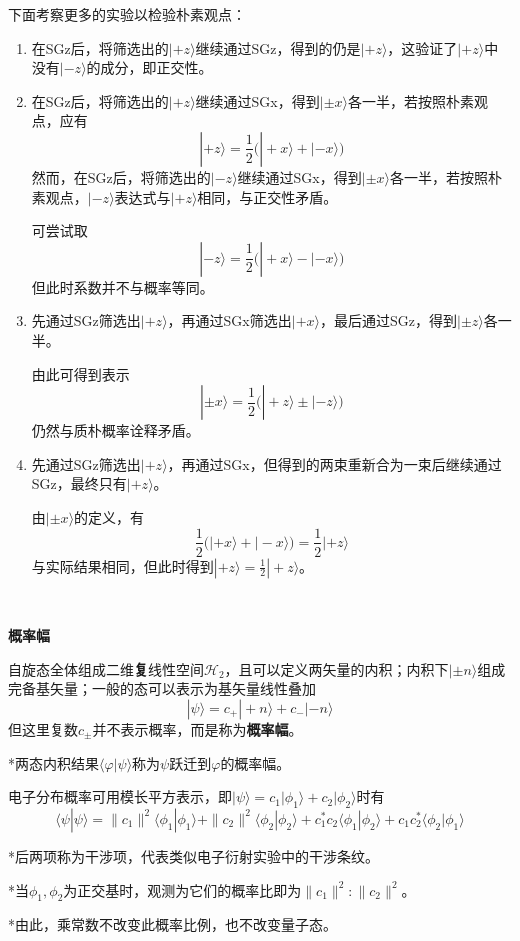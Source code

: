 \documentclass[a4paper,UTF8,fontset=windows]{ctexart}
\newcommand*{\ket}[1]{|#1\rangle}
\newcommand*{\bk}[2]{\langle#1|#2\rangle}
\begin{document}
下面考察更多的实验以检验朴素观点：
\begin{enumerate}
    \item 在SGz后，将筛选出的$\ket{+z}$继续通过SGz，得到的仍是$\ket{+z}$，这验证了$\ket{+z}$中没有$\ket{-z}$的成分，即正交性。
    
    \item 在SGz后，将筛选出的$\ket{+z}$继续通过SGx，得到$\ket{\pm x}$各一半，若按照朴素观点，应有
    $$\ket{+z}=\frac{1}{2}\big(\ket{+x}+\ket{-x}\big)$$
    然而，在SGz后，将筛选出的$\ket{-z}$继续通过SGx，得到$\ket{\pm x}$各一半，若按照朴素观点，$\ket{-z}$表达式与$\ket{+z}$相同，与正交性矛盾。

    可尝试取
    $$\ket{-z}=\frac{1}{2}\big(\ket{+x}-\ket{-x}\big)$$
    但此时系数并不与概率等同。

    \item 先通过SGz筛选出$\ket{+z}$，再通过SGx筛选出$\ket{+x}$，最后通过SGz，得到$\ket{\pm z}$各一半。
    
    由此可得到表示
    $$\ket{\pm x}=\frac{1}{2}\big(\ket{+z}\pm\ket{-z}\big)$$
    仍然与质朴概率诠释矛盾。

    \item 先通过SGz筛选出$\ket{+z}$，再通过SGx，但得到的两束重新合为一束后继续通过SGz，最终只有$\ket{+z}$。
    
    由$\ket{\pm x}$的定义，有
    $$\frac{1}{2}\big(\ket{+x}+\ket{-x}\big)=\frac{1}{2}\ket{+z}$$
    与实际结果相同，但此时得到$\ket{+z}=\frac{1}{2}\ket{+z}$。
\end{enumerate}

\

\textbf{概率幅}

自旋态全体组成二维\textbf{复}线性空间$\mathcal{H}_2$，且可以定义两矢量的内积；内积下$\ket{\pm n}$组成完备基矢量；一般的态可以表示为基矢量线性叠加
$$\ket{\psi}=c_+\ket{+n}+c_-\ket{-n}$$
但这里复数$c_\pm$并不表示概率，而是称为\textbf{概率幅}。

*两态内积结果$\bk{\varphi}{\psi}$称为$\psi$跃迁到$\varphi$的概率幅。

电子分布概率可用模长平方表示，即$\ket{\psi}=c_1\ket{\phi_1}+c_2\ket{\phi_2}$时有
$$\bk{\psi}{\psi}=\|c_1\|^2\bk{\phi_1}{\phi_1}+\|c_2\|^2\bk{\phi_2}{\phi_2}+c_1^*c_2\bk{\phi_1}{\phi_2}+c_1c_2^*\bk{\phi_2}{\phi_1}$$

*后两项称为干涉项，代表类似电子衍射实验中的干涉条纹。

*当$\phi_1,\phi_2$为正交基时，观测为它们的概率比即为$\|c_1\|^2:\|c_2\|^2$。

*由此，乘常数不改变此概率比例，也不改变量子态。
\end{document}
